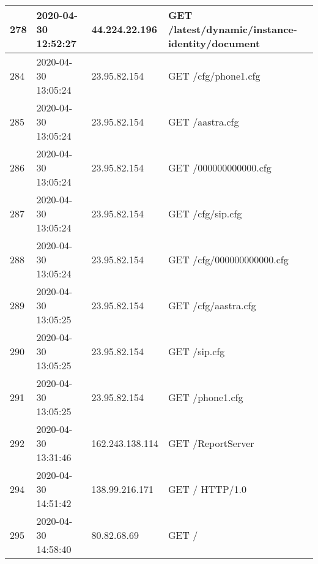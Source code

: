 \documentclass[12pt]{article}
\begin{document}
\begin{longtable}{|l|l|l|l|}
278 & 2020-04-30 12:52:27 & 44.224.22.196   & GET /latest/dynamic/instance-identity/document                                                                                      \\ \hline
284 & 2020-04-30 13:05:24 & 23.95.82.154    & GET /cfg/phone1.cfg                                                                                                                 \\ \hline
285 & 2020-04-30 13:05:24 & 23.95.82.154    & GET /aastra.cfg                                                                                                                     \\ \hline
286 & 2020-04-30 13:05:24 & 23.95.82.154    & GET /000000000000.cfg                                                                                                               \\ \hline
287 & 2020-04-30 13:05:24 & 23.95.82.154    & GET /cfg/sip.cfg                                                                                                                    \\ \hline
288 & 2020-04-30 13:05:24 & 23.95.82.154    & GET /cfg/000000000000.cfg                                                                                                           \\ \hline
289 & 2020-04-30 13:05:25 & 23.95.82.154    & GET /cfg/aastra.cfg                                                                                                                 \\ \hline
290 & 2020-04-30 13:05:25 & 23.95.82.154    & GET /sip.cfg                                                                                                                        \\ \hline
291 & 2020-04-30 13:05:25 & 23.95.82.154    & GET /phone1.cfg                                                                                                                     \\ \hline
292 & 2020-04-30 13:31:46 & 162.243.138.114 & GET /ReportServer                                                                                                                   \\ \hline
294 & 2020-04-30 14:51:42 & 138.99.216.171  & GET / HTTP/1.0                                                                                                                      \\ \hline
295 & 2020-04-30 14:58:40 & 80.82.68.69     & GET /                                                                                                                               \\ \hline

\end{longtable}
\end{document}
